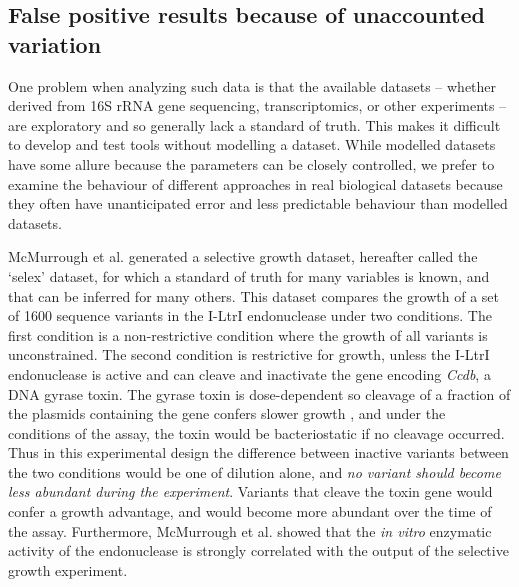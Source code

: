 \documentclass[article]{ajs}\usepackage[]{graphicx}\usepackage[]{color}
\begin{document}
\subsection{False positive results because of unaccounted variation}
\vskip-0.25cm 

One problem when analyzing such data is that the available datasets -- whether derived from 16S rRNA gene sequencing, transcriptomics, or other experiments -- are exploratory and so generally lack a standard of truth. This makes it difficult to develop and test tools without modelling a dataset. While modelled datasets have some allure because the parameters can be closely controlled,  we prefer to examine the behaviour of different approaches in real biological datasets because they often have unanticipated error and less predictable behaviour than modelled datasets.  

McMurrough et al. \citeyear{mcmurrough:2014} generated a selective growth dataset, hereafter called the `selex' dataset, for which a standard of truth for many variables is known, and that can be inferred for many others. This dataset compares the growth of a set of 1600 sequence variants in the I-LtrI endonuclease under two conditions. The first condition is a non-restrictive condition where the growth of all variants is unconstrained. The second condition is restrictive for growth, unless the I-LtrI endonuclease is active and can cleave and inactivate the gene encoding \emph{Ccdb}, a DNA gyrase toxin. The gyrase toxin is dose-dependent so cleavage of a fraction of the plasmids containing the gene  confers slower growth \citep{Smith:2006aa}, and under the conditions of the assay, the toxin would be bacteriostatic if no cleavage occurred. Thus in this experimental design the difference between inactive variants between the two conditions would be one of dilution alone, and \emph{no variant should become less abundant during the experiment}. Variants that cleave the toxin gene would confer a growth advantage, and would become more abundant over the time of the assay. Furthermore, McMurrough et al. \citeyear{mcmurrough:2014} showed that the \emph{in vitro} enzymatic activity of the endonuclease is strongly correlated with the output of the selective growth experiment.
\end{document}
